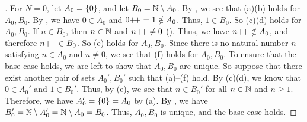 \begin{proof}[]
  For \(N = 0\), let \(A_0 = \left\lbrace0\right\rbrace\), and let \(B_0 = \mathbb{N} \setminus A_0\).
  By , we see that (a)(b) holds for \(A_0, B_0\).
  By , we have \(0 \in A_0\) and \(0{+}\!{+} = 1 \notin A_0\).
  Thus, \(1 \in B_0\).
  So (c)(d) holds for \(A_0, B_0\).
  If \(n \in B_0\), then \(n \in \mathbb{N}\) and \(n{+}\!{+} \neq 0\) ().
  Thus, we have \(n{+}\!{+} \notin A_0\), and therefore \(n{+}\!{+} \in B_0\).
  So (e) holds for \(A_0, B_0\).
  Since there is no natural number \(n\) satisfying \(n \in A_0\) and \(n \neq 0\), we see that (f) holds for \(A_0, B_0\).
  To ensure that the base case holds, we are left to show that \(A_0, B_0\) are unique.
  So suppose that there exist another pair of sets \(A_0', B_0'\) such that (a)--(f) hold.
  By (c)(d), we know that \(0 \in A_0'\) and \(1 \in B_0'\).
  Thus, by (e), we see that \(n \in B_0'\) for all \(n \in \mathbb{N}\) and \(n \geq 1\).
  Therefore, we have \(A_0' = \left\lbrace0\right\rbrace = A_0\) by (a).
  By , we have \(B_0' = \mathbb{N} \setminus A_0' = \mathbb{N} \setminus A_0 = B_0\).
  Thus, \(A_0, B_0\) is unique, and the base case holds.


\end{proof}
